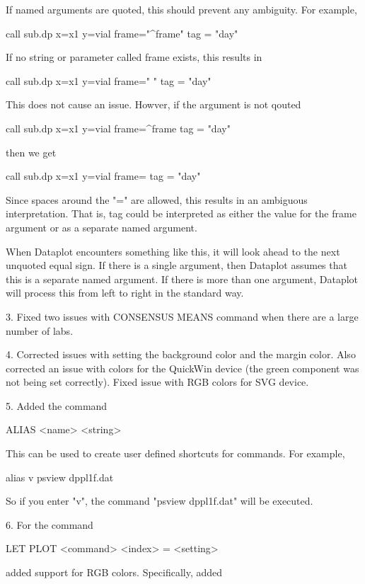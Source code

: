         If named arguments are quoted, this should prevent any
        ambiguity.  For example,

            call sub.dp   x=x1  y=vial  frame="^frame" tag = "day"

        If no string or parameter called frame exists, this results in

            call sub.dp   x=x1  y=vial  frame=" " tag = "day"

        This does not cause an issue.  Howver, if the argument is not
        qouted

            call sub.dp   x=x1  y=vial  frame=^frame tag = "day"

        then we get

            call sub.dp   x=x1  y=vial  frame=  tag = "day"

        Since spaces around the "=" are allowed, this results in an
        ambiguous interpretation.  That is, tag could be interpreted
        as either the value for the frame argument or as a separate
        named argument.

        When Dataplot encounters something like this, it will look
        ahead to the next unquoted equal sign.  If there is a single
        argument, then Dataplot assumes that this is a separate named
        argument.  If there is more than one argument, Dataplot will
        process this from left to right in the standard way.

 3. Fixed two issues with CONSENSUS MEANS command when there are a large
    number of labs.

 4. Corrected issues with setting the background color and the margin
    color.  Also corrected an issue with colors for the QuickWin device
    (the green component was not being set correctly).  Fixed issue with
    RGB colors for SVG device.

 5. Added the command

        ALIAS  <name>  <string>

    This can be used to create user defined shortcuts for commands.
    For example,

        alias v  psview dppl1f.dat

    So if you enter "v", the command "psview dppl1f.dat" will be
    executed.

 6. For the command

        LET PLOT <command> <index> = <setting>

    added support for RGB colors.  Specifically, added

